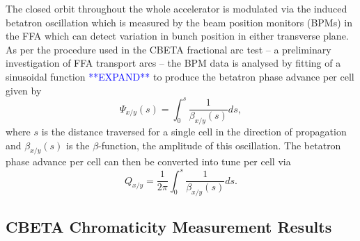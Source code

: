 \documentclass[../main.tex]{subfiles}
\begin{document}
The closed orbit throughout the whole accelerator is modulated via the induced betatron oscillation which is measured by the beam position monitors (BPMs) in the FFA which can detect variation in bunch position in either transverse plane. As per the procedure used in the CBETA fractional arc test \cite{gulliford2019beam} -- a preliminary investigation of FFA transport arcs -- the BPM data is analysed by fitting of a sinusoidal function \textcolor{blue}{**EXPAND**} to produce the betatron phase advance per cell given by
\begin{equation}
\Psi_{x/y}\left(s\right) = \int_{0}^{s}\frac{1}{\beta_{x/y}\left(s\right)}ds,
\label{eq:betatron_phase_advance_per_cell}
\end{equation}
where $s$ is the distance traversed for a single cell in the direction of propagation and $\beta_{x/y}\left(s\right)$ is the $\beta$-function, the amplitude of this oscillation. The betatron phase advance per cell can then be converted into tune per cell via 
\begin{equation}
Q_{x/y} = \frac{1}{2\pi}\int_{0}^{s} \frac{1}{\beta_{x/y}\left(s\right)}ds.
\label{eq:tune_definition}
\end{equation}

\subsection{CBETA Chromaticity Measurement Results}
\label{sec:CBETA_chromaticity_measurement_results}
\end{document}
